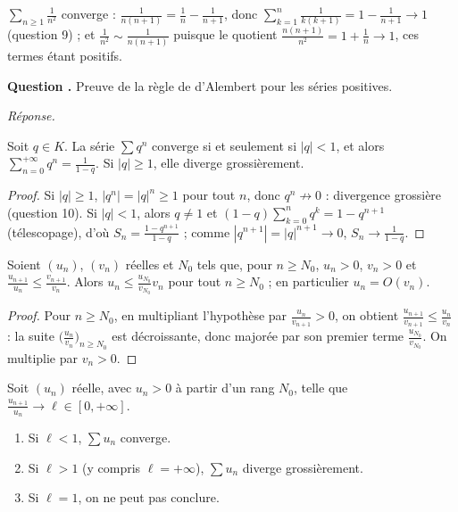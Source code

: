 \documentclass[11pt]{article}
\newcounter{qnum}
\newcommand{\question}[1]{%
\stepcounter{qnum}%
\bigskip
\noindent\textbf{Question \theqnum.} #1\par}
\newcommand{\reponse}{\noindent\textit{Réponse.}\ }
\begin{document}
\begin{exemple}
\label{ex:1-sur-n2}
$\sum_{n\geq1}\frac{1}{n^2}$ converge : $\frac{1}{n(n+1)}=\frac1n-\frac1{n+1}$, donc $\sum_{k=1}^n\frac{1}{k(k+1)}=1-\frac{1}{n+1}\to 1$ (question 9) ; et $\frac{1}{n^2}\sim\frac{1}{n(n+1)}$ puisque le quotient $\frac{n(n+1)}{n^2}=1+\frac1n\to 1$, ces termes étant positifs.
\end{exemple}

\question{Preuve de la règle de d'Alembert pour les séries positives.}
\reponse

\begin{lemme}
\label{lemme:serie-geometrique}
Soit $q\in K$. La série $\sum q^n$ converge si et seulement si $|q|<1$, et alors $\sum_{n=0}^{+\infty}q^n=\frac{1}{1-q}$. Si $|q|\geq 1$, elle diverge grossièrement.
\end{lemme}

\begin{proof}
Si $|q|\geq 1$, $|q^n|=|q|^n\geq 1$ pour tout $n$, donc $q^n\not\to 0$ : divergence grossière (question 10). Si $|q|<1$, alors $q\neq 1$ et $(1-q)\sum_{k=0}^nq^k=1-q^{n+1}$ (télescopage), d'où $S_n=\frac{1-q^{n+1}}{1-q}$ ; comme $|q^{n+1}|=|q|^{n+1}\to 0$, $S_n\to\frac{1}{1-q}$.
\end{proof}

\begin{lemme}
\label{lemme:comparaison-log}
Soient $(u_n)$, $(v_n)$ réelles et $N_0$ tels que, pour $n\geq N_0$, $u_n>0$, $v_n>0$ et $\frac{u_{n+1}}{u_n}\leq\frac{v_{n+1}}{v_n}$. Alors $u_n\leq\frac{u_{N_0}}{v_{N_0}}v_n$ pour tout $n\geq N_0$ ; en particulier $u_n=O(v_n)$.
\end{lemme}

\begin{proof}
Pour $n\geq N_0$, en multipliant l'hypothèse par $\frac{u_n}{v_{n+1}}>0$, on obtient $\frac{u_{n+1}}{v_{n+1}}\leq\frac{u_n}{v_n}$ : la suite $\big(\frac{u_n}{v_n}\big)_{n\geq N_0}$ est décroissante, donc majorée par son premier terme $\frac{u_{N_0}}{v_{N_0}}$. On multiplie par $v_n>0$.
\end{proof}

\begin{theo}
\label{theo:dalembert}
Soit $(u_n)$ réelle, avec $u_n>0$ à partir d'un rang $N_0$, telle que $\frac{u_{n+1}}{u_n}\to\ell\in[0,+\infty]$.
\begin{enumerate}
\item Si $\ell<1$, $\sum u_n$ converge.
\item Si $\ell>1$ (y compris $\ell=+\infty$), $\sum u_n$ diverge grossièrement.
\item Si $\ell=1$, on ne peut pas conclure.
\end{enumerate}
\end{theo}
\end{document}
